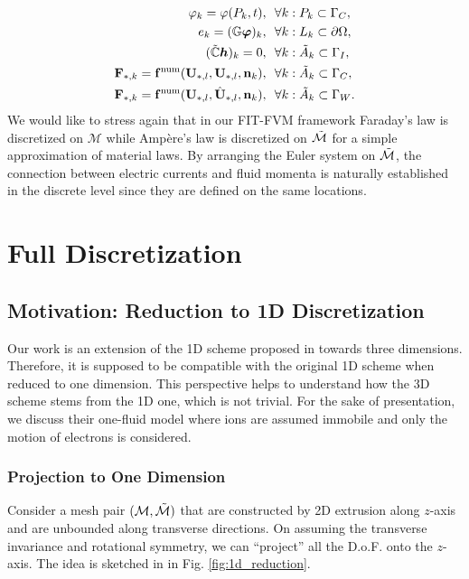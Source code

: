 \documentclass{article}
\begin{document}
\begin{subequations}
\begin{align}
    \varphi_k = \varphi(P_k, t), \ \ &\forall k : P_k \subset \Gamma_C, \\
    e_k = (\mathbb{G}\bm{\varphi})_k,\ \ &\forall k : L_k \subset \partial\Omega, \\
    (\Tilde{\mathbb{C}} \bm{h})_k = 0,\ \ &\forall k : \Tilde{A}_k \subset \Gamma_I, \label{equ:bc_zero_curl_h} \\
    \mathbf{F}_{\ast,k} = \mathbf{f}^\text{num}(\mathbf{U}_{\ast,l}, \mathbf{U}_{\ast,l}, \mathbf{n}_k), \ \ &\forall k: \Tilde{A}_k \subset \Gamma_C, \\
    \mathbf{F}_{\ast,k} = \mathbf{f}^\text{num}(\mathbf{U}_{\ast,l}, \hat{\mathbf{U}}_{\ast,l}, \mathbf{n}_k), \ \ &\forall k: \Tilde{A}_k \subset \Gamma_W.
    \end{align}
\end{subequations}
We would like to stress again that in our FIT-FVM framework Faraday's law is discretized on $\mathcal{M}$ while Amp\`{e}re's law is discretized on $\Tilde{\mathcal{M}}$ for a simple approximation of material laws. By arranging the Euler system on $\Tilde{\mathcal{M}}$, the connection between electric currents and fluid momenta is naturally established in the discrete level since they are defined on the same locations.    


\section{Full Discretization}
\subsection{Motivation: Reduction to 1D Discretization}
Our work is an extension of the 1D scheme proposed in \cite{degond_2012} towards three dimensions. Therefore, it is supposed to be compatible with the original 1D scheme when reduced to one dimension. This perspective helps to understand how the 3D scheme stems from the 1D one, which is not trivial. For the sake of presentation, we discuss their one-fluid model where ions are assumed immobile and only the motion of electrons is considered.  

\subsubsection{Projection to One Dimension} \label{sec:projection_to_1d}
Consider a mesh pair $(\mathcal{M}, \Tilde{\mathcal{M}})$ that are constructed by 2D extrusion along $z$-axis and are unbounded along transverse directions. On assuming the transverse invariance and rotational symmetry, we can ``project'' all the D.o.F. onto the $z$-axis. The idea is sketched in in Fig. \ref{fig:1d_reduction}.
\end{document}
